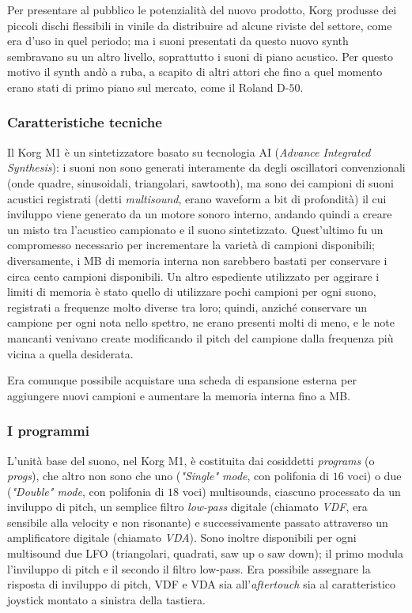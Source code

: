 \documentclass[12pt]{article}
\begin{document}
Per presentare al pubblico le potenzialità del nuovo prodotto, Korg produsse dei piccoli dischi flessibili in vinile da distribuire ad alcune riviste del settore, come era d'uso in quel periodo; ma i suoni presentati da questo nuovo synth sembravano su un altro livello, soprattutto i suoni di piano acustico. Per questo motivo il synth andò a ruba, a scapito di altri attori che fino a quel momento erano stati di primo piano sul mercato, come il Roland D-\(50\).

\subsubsection{Caratteristiche tecniche}
Il Korg M1 è un sintetizzatore basato su tecnologia AI (\emph{Advance Integrated Synthesis}): i suoni non sono generati interamente da degli oscillatori convenzionali (onde quadre, sinusoidali, triangolari, sawtooth), ma sono dei campioni di suoni acustici registrati (detti \emph{multisound}, erano waveform a \unit[16]{bit} di profondità) il cui inviluppo viene generato da un motore sonoro interno, andando quindi a creare un misto tra l'acustico campionato e il suono sintetizzato. Quest'ultimo fu un compromesso necessario per incrementare la varietà di campioni disponibili; diversamente, i \unit[4]{MB} di memoria interna non sarebbero bastati per conservare i circa cento campioni disponibili. Un altro espediente utilizzato per aggirare i limiti di memoria è stato quello di utilizzare pochi campioni per ogni suono, registrati a frequenze molto diverse tra loro; quindi, anziché conservare un campione per ogni nota nello spettro, ne erano presenti molti di meno, e le note mancanti venivano create modificando il pitch del campione dalla frequenza più vicina a quella desiderata.

Era comunque possibile acquistare una scheda di espansione esterna per aggiungere nuovi campioni e aumentare la memoria interna fino a \unit[8]{MB}.

\subsubsection{I programmi}
L'unità base del suono, nel Korg M1, è costituita dai cosiddetti \emph{programs} (o \emph{progs}), che altro non sono che uno (\emph{"Single" mode}, con polifonia di \(16\) voci) o due (\emph{"Double" mode}, con polifonia di \(18\) voci) multisounds, ciascuno processato da un inviluppo di pitch, un semplice filtro \emph{low-pass} digitale (chiamato \emph{VDF}, era sensibile alla velocity e non risonante) e successivamente passato attraverso un amplificatore digitale (chiamato \emph{VDA}). Sono inoltre disponibili per ogni multisound due LFO (triangolari, quadrati, saw up o saw down); il primo modula l'inviluppo di pitch e il secondo il filtro low-pass. Era possibile assegnare la risposta di inviluppo di pitch, VDF e VDA sia all'\emph{aftertouch} sia al caratteristico joystick montato a sinistra della tastiera.
\end{document}
